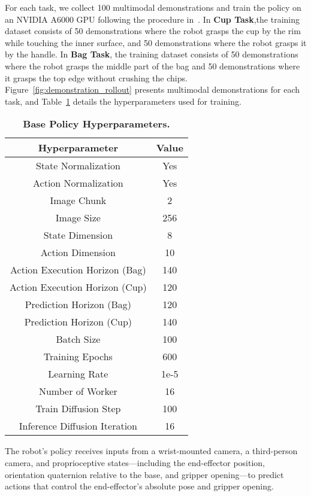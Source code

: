  For each task, we collect 100 multimodal demonstrations and train the policy on an NVIDIA A6000 GPU following the procedure in~\citep{chi2024diffusionpolicy}.  In \textbf{Cup Task},the training dataset consists of 50 demonstrations where the robot grasps the cup by the rim while touching the inner surface, and 50 demonstrations where the robot grasps it by the handle. In \textbf{Bag Task}, the training dataset consists of 50 demonstrations where the robot grasps the middle part of the bag and 50 demonstrations where it grasps the top edge without crushing the chips. Figure~\ref{fig:demonstration_rollout} presents multimodal demonstrations for each task, and Table~\ref{tab:base_policy} details the hyperparameters used for training. 
\begin{table}[ht]
    \centering
    \begin{tabular}{c|c}
        Hyperparameter & Value  \\
        \hline
         State Normalization & Yes \\
         Action Normalization & Yes \\
         Image Chunk & 2  \\
         Image Size & 256 \\
         State Dimension & 8 \\
         Action Dimension & 10 \\
         Action Execution Horizon (Bag) & 140 \\
         Action Execution Horizon (Cup) & 120 \\
          Prediction Horizon (Bag) & 120 \\
         Prediction Horizon (Cup) & 140 \\
         Batch Size & 100 \\
         Training Epochs &  600 \\
         Learning Rate &  1e-5\\
         Number of Worker& 16 \\
         Train Diffusion Step & 100 \\
         Inference Diffusion Iteration & 16 \\
         
         \hline
   
    \end{tabular}
    \caption{\textbf{Base Policy Hyperparameters.}}
    \label{tab:base_policy}
\end{table}

 The robot’s policy receives inputs from a wrist-mounted camera, a third-person camera, and proprioceptive states—including the end-effector position, orientation quaternion relative to the base, and gripper opening—to predict actions that control the end-effector’s absolute pose and gripper opening.



